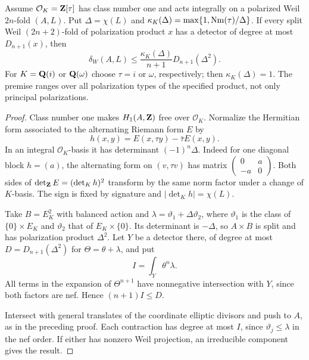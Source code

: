 \begin{theorem}\label{thm:explicit-stabilization}
Assume $\mathcal O_K=\mathbf Z[\tau]$ has class number one and acts integrally on a polarized Weil $2n$-fold $(A,L)$. Put $\Delta=\chi(L)$ and
$\kappa_K(\Delta)=\max\{1,\operatorname{Nm}(\tau)/\Delta\}$. If every split Weil $(2n+2)$-fold of polarization product $x$ has a detector of degree at most $D_{n+1}(x)$, then
\[
 \delta_W(A,L)\leq\frac{\kappa_K(\Delta)}{n+1}D_{n+1}(\Delta^2).
\]
For $K=\mathbf Q(i)$ or $\mathbf Q(\omega)$ choose $\tau=i$ or $\omega$, respectively; then $\kappa_K(\Delta)=1$. The premise ranges over all polarization types of the specified product, not only principal polarizations.
\end{theorem}

\begin{proof}
Class number one makes $H_1(A,\mathbf Z)$ free over $\mathcal O_K$. Normalize the Hermitian form associated to the alternating Riemann form $E$ by
\[
 h(x,y)=E(x,\tau y)-\bar\tau E(x,y).
\]
In an integral $\mathcal O_K$-basis it has determinant $(-1)^n\Delta$. Indeed for one diagonal block $h=(a)$, the alternating form on $(v,\tau v)$ has matrix $\left(\begin{smallmatrix}0&a\\-a&0\end{smallmatrix}\right)$. Both sides of $\det_\mathbf Z E=(\det_Kh)^2$ transform by the same norm factor under a change of $K$-basis. The sign is fixed by signature and $|\det_Kh|=\chi(L)$.

Take $B=E_K^2$ with balanced action and $\lambda=\vartheta_1+\Delta\vartheta_2$, where $\vartheta_1$ is the class of $\{0\}\times E_K$ and $\vartheta_2$ that of $E_K\times\{0\}$. Its determinant is $-\Delta$, so $A\times B$ is split and has polarization product $\Delta^2$. Let $Y$ be a detector there, of degree at most $D=D_{n+1}(\Delta^2)$ for $\Theta=\theta+\lambda$, and put
\[
 I=\int_Y\theta^n\lambda.
\]
All terms in the expansion of $\Theta^{n+1}$ have nonnegative intersection with $Y$, since both factors are nef. Hence $(n+1)I\le D$.

Intersect with general translates of the coordinate elliptic divisors and push to $A$, as in the preceding proof. Each contraction has degree at most $I$, since $\vartheta_j\le\lambda$ in the nef order. If either has nonzero Weil projection, an irreducible component gives the result.


\end{proof}
